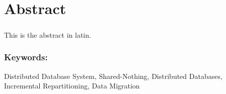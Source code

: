 
\chapter*{Abstract}

\paragraph*{}
This is the abstract in latin.

\subsection*{Keywords:}
Distributed Database System, Shared-Nothing, Distributed Databases, Incremental Repartitioning, Data Migration